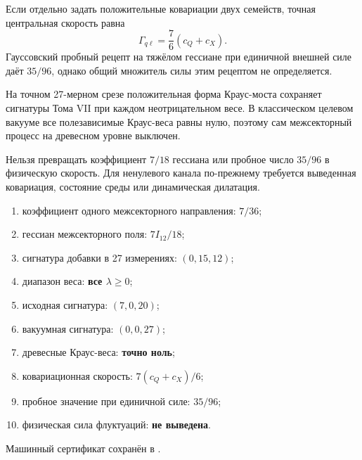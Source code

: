 Если отдельно задать положительные ковариации двух семейств, точная
центральная скорость равна
\begin{equation}
 \Gamma_{q\ell}=\frac76(c_Q+c_X).
\end{equation}
Гауссовский пробный рецепт на тяжёлом гессиане при единичной внешней силе
даёт $35/96$, однако общий множитель силы этим рецептом не определяется.

\begin{theorem}
На точном 27-мерном срезе положительная форма Краус-моста сохраняет
сигнатуры Тома VII при каждом неотрицательном весе. В классическом целевом
вакууме все полезависимые Краус-веса равны нулю, поэтому сам межсекторный
процесс на древесном уровне выключен.
\end{theorem}

\begin{nogocriterion}
Нельзя превращать коэффициент $7/18$ гессиана или пробное число $35/96$ в
физическую скорость. Для ненулевого канала по-прежнему требуется выведенная
ковариация, состояние среды или динамическая дилатация.
\end{nogocriterion}

\begin{protocol}
\begin{enumerate}
 \item коэффициент одного межсекторного направления: \textbf{$7/36$};
 \item гессиан межсекторного поля: \textbf{$7I_{12}/18$};
 \item сигнатура добавки в 27 измерениях: \textbf{$(0,15,12)$};
 \item диапазон веса: \textbf{все $\lambda\ge0$};
 \item исходная сигнатура: \textbf{$(7,0,20)$};
 \item вакуумная сигнатура: \textbf{$(0,0,27)$};
 \item древесные Краус-веса: \textbf{точно ноль};
 \item ковариационная скорость: \textbf{$7(c_Q+c_X)/6$};
 \item пробное значение при единичной силе: \textbf{$35/96$};
 \item физическая сила флуктуаций: \textbf{не выведена}.
\end{enumerate}
\end{protocol}

Машинный сертификат сохранён в
.